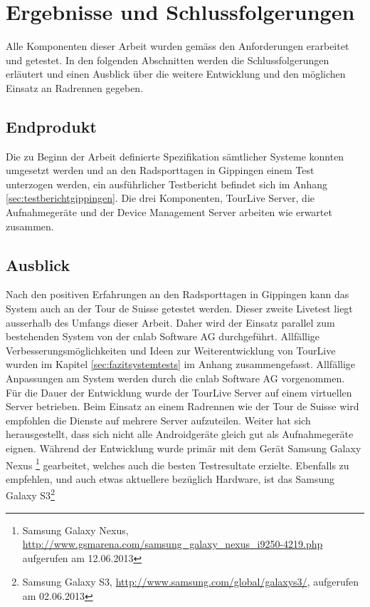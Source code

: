 \chapter{Ergebnisse und Schlussfolgerungen}

Alle Komponenten dieser Arbeit wurden gemäss den Anforderungen erarbeitet und getestet. In den folgenden Abschnitten werden die Schlussfolgerungen erläutert und einen Ausblick über die weitere Entwicklung und den möglichen Einsatz an Radrennen gegeben.

\section{Endprodukt}
Die zu Beginn der Arbeit definierte Spezifikation sämtlicher Systeme konnten umgesetzt werden und an den Radsporttagen in Gippingen einem Test unterzogen werden, ein ausführlicher Testbericht befindet sich im Anhang \ref{sec:testberichtgippingen}. Die drei Komponenten, TourLive Server, die Aufnahmegeräte und der Device Management Server arbeiten wie erwartet zusammen.
\\

\section{Ausblick}
Nach den positiven Erfahrungen an den Radsporttagen in Gippingen kann das System auch an der Tour de Suisse getestet werden. Dieser zweite Livetest liegt  ausserhalb des Umfangs dieser Arbeit. Daher wird der Einsatz parallel zum bestehenden System von der cnlab Software AG durchgeführt. Allfällige Verbesserungsmöglichkeiten und Ideen zur Weiterentwicklung von TourLive wurden im Kapitel \ref{sec:fazitsystemtests} im Anhang zusammengefasst.  Allfällige Anpassungen am System werden durch die cnlab Software AG vorgenommen.
\\

Für die Dauer der Entwicklung wurde der TourLive Server auf einem virtuellen Server betrieben. Beim Einsatz an einem Radrennen wie der Tour de Suisse wird empfohlen die Dienste auf mehrere Server aufzuteilen. Weiter hat sich herausgestellt, dass sich nicht alle Androidgeräte gleich gut als Aufnahmegeräte eignen. Während der Entwicklung wurde primär mit dem Gerät Samsung Galaxy Nexus \footnote{Samsung Galaxy Nexus, \url{http://www.gsmarena.com/samsung_galaxy_nexus_i9250-4219.php} aufgerufen am 12.06.2013} gearbeitet, welches auch die besten Testresultate erzielte. Ebenfalls zu empfehlen, und auch etwas aktuellere bezüglich Hardware, ist das Samsung Galaxy S3\footnote{Samsung Galaxy S3, \url{http://www.samsung.com/global/galaxys3/}, aufgerufen am 02.06.2013}

